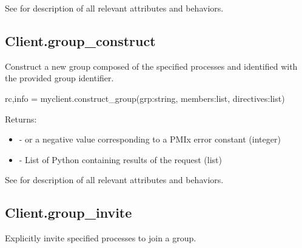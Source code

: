 See  for description of all relevant attributes and behaviors.


\subsection{Client.group_construct}

\summary

Construct a new group composed of the specified processes and identified with
the provided group identifier.

\format

\pyspecificstart
\begin{codepar}
rc,info = myclient.construct_group(grp:string,
                        members:list, directives:list)
\end{codepar}
\pyspecificend

\begin{arglist}
\end{arglist}

Returns:

\begin{itemize}
    \item {} -  or a negative value corresponding to a PMIx error constant (integer)
    \item {} - List of Python  containing results of the request (list)
\end{itemize}

See  for description of all relevant attributes and behaviors.


\subsection{Client.group_invite}

\summary

Explicitly invite specified processes to join a group.

\format

